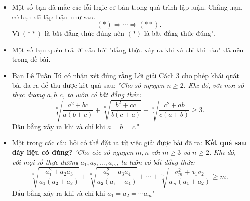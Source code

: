 \begin{bt}
{\begin{nx}
\begin{itemize}
\item  Một số bạn đã mắc các lỗi logic cơ bản trong quá trình lập luận. Chẳng hạn, có bạn đã lập luận như sau: 
$$(*) \Rightarrow \cdots \Rightarrow (**).$$
\noindent Vì $(**)$ là bất đẳng thức đúng nên $(*)$ là bất đẳng thức đúng". 
\item  Một số bạn quên trả lời câu hỏi "đẳng thức xảy ra khi và chỉ khi nào" đã nêu trong đề bài.
\item  Bạn Lê Tuấn Tú có nhận xét đúng rằng Lời giải Cách $3$ cho phép khái quát bài đã ra để thu được kết quả sau:
 \textit{"Cho số nguyên $n \geq 2$. Khi đó, với mọi số thực dương $a, b, c$, ta luôn có bất đẳng thức:} 
$$\sqrt[n]{\dfrac{a^2 + bc}{a(b + c)}} + \sqrt[n]{\dfrac{b^2 + ca}{b(c + a)}} + \sqrt[n]{\dfrac{c^2 + ab}{c(a + b)}} \geq 3.$$
\noindent Dấu bằng xảy ra khi và chỉ khi $a = b = c.$"
\item  Một trong các câu hỏi có thể đặt ra từ việc giải được bài đã ra: \textbf{Kết quả sau đây liệu có đúng?} 
\noindent \textit{"Cho các số nguyên $m, n$ với $m \geq 3$ và $n \geq 2$. Khi đó, với mọi số thực dương $a_1, a_2, \ldots , a_m$, ta luôn có bất đẳng thức:} 
$$\sqrt[n]{\dfrac{a_1^2 + a_2a_3}{a_1(a_2 + a_3)}} + \sqrt[n]{\dfrac{a_2^2 + a_3a_4}{a_2(a_3 + a_4)}} + \cdots + \sqrt[n]{\dfrac{a_m^2 + a_1 a_2}{a_m(a_1 + a_2)}} \geq m.$$
\noindent Dấu bằng xảy ra khi và chỉ khi $a_1 = a_2 = \cdots a_m$"
 \end{itemize}
\end{nx}
}
\end{bt}
